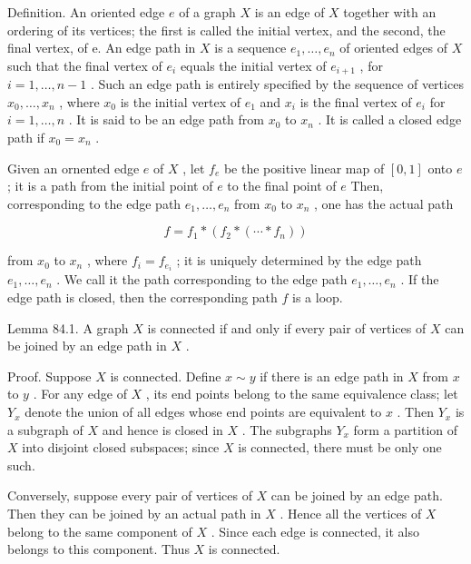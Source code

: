 Definition. An oriented edge \(e\) of a graph \(X\) is an edge of \(X\) together with an ordering of its vertices; the first is called the initial vertex, and the second, the final vertex, of e. An edge path in \(X\) is a sequence \({e}_{1},\ldots ,{e}_{n}\) of oriented edges of \(X\) such that the final vertex of \({e}_{i}\) equals the initial vertex of \({e}_{i + 1}\) , for \(i = 1,\ldots ,n - 1\) . Such an edge path is entirely specified by the sequence of vertices \({x}_{0},\ldots ,{x}_{n}\) , where \({x}_{0}\) is the initial vertex of \({e}_{1}\) and \({x}_{i}\) is the final vertex of \({e}_{i}\) for \(i = 1,\ldots ,n\) . It is said to be an edge path from \({x}_{0}\) to \({x}_{n}\) . It is called a closed edge path if \({x}_{0} = {x}_{n}\) .

Given an ornented edge \(e\) of \(X\) , let \({f}_{e}\) be the positive linear map of \(\left\lbrack  {0,1}\right\rbrack\) onto \(e\) ; it is a path from the initial point of \(e\) to the final point of \(e\) Then, corresponding to the edge path \({e}_{1},\ldots ,{e}_{n}\) from \({x}_{0}\) to \({x}_{n}\) , one has the actual path

\[
f = {f}_{1} * \left( {{f}_{2} * \left( {\cdots  * {f}_{n}}\right) }\right)
\]

from \({x}_{0}\) to \({x}_{n}\) , where \({f}_{i} = {f}_{{e}_{i}}\) ; it is uniquely determined by the edge path \({e}_{1},\ldots ,{e}_{n}\) . We call it the path corresponding to the edge path \({e}_{1},\ldots ,{e}_{n}\) . If the edge path is closed, then the corresponding path \(f\) is a loop.

Lemma 84.1. A graph \(X\) is connected if and only if every pair of vertices of \(X\) can be joined by an edge path in \(X\) .

Proof. Suppose \(X\) is connected. Define \(x \sim  y\) if there is an edge path in \(X\) from \(x\) to \(y\) . For any edge of \(X\) , its end points belong to the same equivalence class; let \({Y}_{x}\) denote the union of all edges whose end points are equivalent to \(x\) . Then \({Y}_{x}\) is a subgraph of \(X\) and hence is closed in \(X\) . The subgraphs \({Y}_{x}\) form a partition of \(X\) into disjoint closed subspaces; since \(X\) is connected, there must be only one such.

Conversely, suppose every pair of vertices of \(X\) can be joined by an edge path. Then they can be joined by an actual path in \(X\) . Hence all the vertices of \(X\) belong to the same component of \(X\) . Since each edge is connected, it also belongs to this component. Thus \(X\) is connected.

